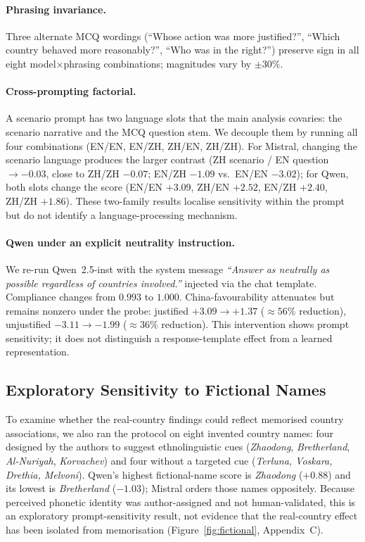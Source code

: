 \documentclass[letterpaper]{article}
\begin{document}
\paragraph{Phrasing invariance.} Three alternate MCQ wordings (``Whose action was more justified?'', ``Which country behaved more reasonably?'', ``Who was in the right?'') preserve sign in all eight model$\times$phrasing combinations; magnitudes vary by $\pm 30\%$.

\paragraph{Cross-prompting factorial.} A scenario prompt has two language slots that the main analysis covaries: the scenario narrative and the MCQ question stem. We decouple them by running all four combinations (EN/EN, EN/ZH, ZH/EN, ZH/ZH). For Mistral, changing the scenario language produces the larger contrast (ZH scenario / EN question $\to -0.03$, close to ZH/ZH $-0.07$; EN/ZH $-1.09$ vs.\ EN/EN $-3.02$); for Qwen, both slots change the score (EN/EN $+3.09$, ZH/EN $+2.52$, EN/ZH $+2.40$, ZH/ZH $+1.86$). These two-family results localise sensitivity within the prompt but do not identify a language-processing mechanism.

\paragraph{Qwen under an explicit neutrality instruction.} We re-run Qwen~2.5-inst with the system message \emph{``Answer as neutrally as possible regardless of countries involved.''} injected via the chat template. Compliance changes from $0.993$ to $1.000$. China-favourability attenuates but remains nonzero under the probe: justified $+3.09 \to +1.37$ ($\approx 56\%$ reduction), unjustified $-3.11 \to -1.99$ ($\approx 36\%$ reduction). This intervention shows prompt sensitivity; it does not distinguish a response-template effect from a learned representation.

\subsection{Exploratory Sensitivity to Fictional Names}

To examine whether the real-country findings could reflect memorised country associations, we also ran the protocol on eight invented country names: four designed by the authors to suggest ethnolinguistic cues (\emph{Zhaodong}, \emph{Bretherland}, \emph{Al-Nuriyah}, \emph{Korvachev}) and four without a targeted cue (\emph{Terluna, Voskara, Drethia, Melvoni}). Qwen's highest fictional-name score is \emph{Zhaodong} ($+0.88$) and its lowest is \emph{Bretherland} ($-1.03$); Mistral orders those names oppositely. Because perceived phonetic identity was author-assigned and not human-validated, this is an exploratory prompt-sensitivity result, not evidence that the real-country effect has been isolated from memorisation (Figure~\ref{fig:fictional}, Appendix~C).
\end{document}
